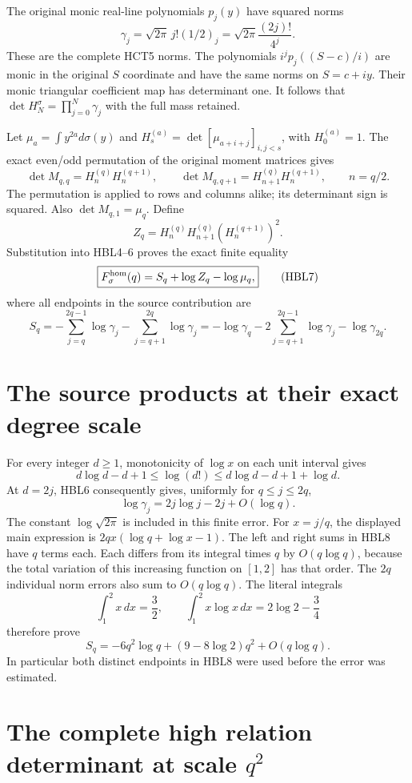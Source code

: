 \documentclass[11pt,a4paper]{article}
\begin{document}
The original monic real-line polynomials $p_j(y)$ have squared norms
\[
 \gamma_j=\sqrt{2\pi}\,j!(1/2)_j
          =\sqrt{2\pi}\frac{(2j)!}{4^j}.
 \tag{HBL6}
\]
These are the complete HCT5 norms. The polynomials
$i^jp_j((S-c)/i)$ are monic in the original $S$ coordinate and have
the same norms on $S=c+iy$. Their monic triangular coefficient map
has determinant one. It follows that
$\det H_N^\sigma=\prod_{j=0}^N\gamma_j$ with the full mass retained.

Let $\mu_a=\int y^{2a}d\sigma(y)$ and
$H_s^{(a)}=\det[\mu_{a+i+j}]_{i,j<s}$, with $H_0^{(a)}=1$.
The exact even/odd permutation of the original moment matrices gives
\[
 \det M_{q,q}=H_n^{(q)}H_n^{(q+1)},\qquad
 \det M_{q,q+1}=H_{n+1}^{(q)}H_n^{(q+1)},\qquad n=q/2.
\]
The permutation is applied to rows and columns alike; its determinant
sign is squared. Also $\det M_{q,1}=\mu_q$. Define
\[
 Z_q=H_n^{(q)}H_{n+1}^{(q)}(H_n^{(q+1)})^2.
\]
Substitution into HBL4--6 proves the exact finite equality
\[
 \boxed{F_\sigma^{\rm hom}(q)=S_q+\log Z_q-\log\mu_q,}
 \tag{HBL7}
\]
where all endpoints in the source contribution are
\[
 S_q=-\sum_{j=q}^{2q-1}\log\gamma_j
     -\sum_{j=q+1}^{2q}\log\gamma_j
     =-\log\gamma_q-2\sum_{j=q+1}^{2q-1}\log\gamma_j
      -\log\gamma_{2q}.
 \tag{HBL8}
\]

\section{The source products at their exact degree scale}

For every integer $d\ge1$, monotonicity of $\log x$ on each unit
interval gives
\[
 d\log d-d+1\le\log(d!)
                \le d\log d-d+1+\log d.
\]
At $d=2j$, HBL6 consequently gives, uniformly for $q\le j\le2q$,
\[
 \log\gamma_j=2j\log j-2j+O(\log q).
\]
The constant $\log\sqrt{2\pi}$ is included in this finite error.
For $x=j/q$, the displayed main expression is
$2qx(\log q+\log x-1)$. The left and right sums in HBL8 have
$q$ terms each. Each differs from its integral times $q$ by
$O(q\log q)$, because the total variation of this increasing function
on $[1,2]$ has that order. The $2q$ individual norm errors also sum
to $O(q\log q)$. The literal integrals
\[
 \int_1^2x\,dx=\frac32,\qquad
 \int_1^2x\log x\,dx=2\log2-\frac34
\]
therefore prove
\[
 \boxed{S_q=-6q^2\log q+(9-8\log2)q^2+O(q\log q).}
 \tag{HBL9}
\]
In particular both distinct endpoints in HBL8 were used before the
error was estimated.

\section{The complete high relation determinant at scale $q^2$}
\end{document}
